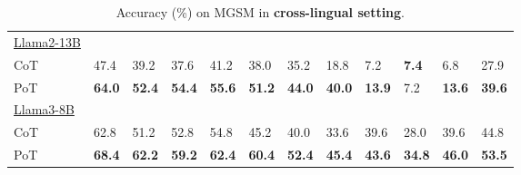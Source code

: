 \begin{table*}[ht]
{\begin{tabular}{l|llllllllll|l}
    \hline    
    \multicolumn{1}{l|}{\underline{Llama2-13B}} &     %
    \multicolumn{1}{c}{} & \multicolumn{6}{c}{} & \multicolumn{3}{c|}{} & \multicolumn{1}{c}{} \\     
    CoT & 47.4 & 39.2 & 37.6 & 41.2 & 38.0 & 35.2 & 18.8 & 7.2 & \textbf{7.4} & 6.8 & 27.9 \\
    PoT & \textbf{64.0} & \textbf{52.4} & \textbf{54.4} & \textbf{55.6} & \textbf{51.2} & \textbf{44.0} & \textbf{40.0} & \textbf{13.9} & 7.2 & \textbf{13.6} & \textbf{39.6} \\
    \hline        
    \multicolumn{1}{l|}{\underline{Llama3-8B}} &    %
    \multicolumn{1}{c}{} & \multicolumn{6}{c}{} & \multicolumn{3}{c|}{} & \multicolumn{1}{c}{} \\ 
    CoT & 62.8 & 51.2 & 52.8 & 54.8 & 45.2 & 40.0 & 33.6 & 39.6 & 28.0 & 39.6 & 44.8 \\
    PoT & \textbf{68.4} & \textbf{62.2} & \textbf{59.2} & \textbf{62.4} & \textbf{60.4} & \textbf{52.4} & \textbf{45.4} & \textbf{43.6} & \textbf{34.8} & \textbf{46.0} & \textbf{53.5} \\    
    \hline
  \end{tabular}
  }
  \caption{
  Accuracy (\%) on MGSM in \textbf{cross-lingual setting}.
  }
  \label{tab:main-cross}

\end{table*}



